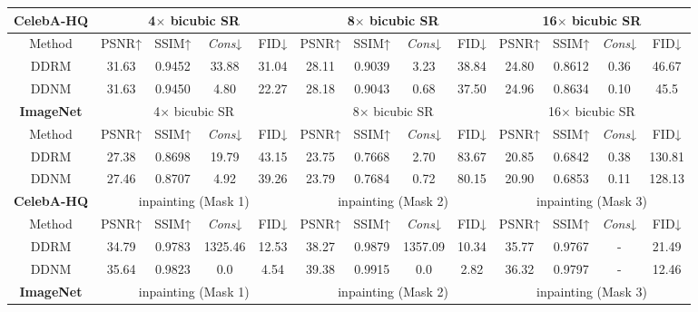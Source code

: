\documentclass{article} \usepackage{iclr2023_conference,times}
\begin{document}
\begin{table*}[h]
\scriptsize
    \begin{tabular}{c | cccc | cccc| cccc}
        \hline
           \multicolumn{1}{c}{\rule{0pt}{10pt}\tiny\textbf{CelebA-HQ}}&\multicolumn{4}{c}{4$\times$ bicubic SR} &\multicolumn{4}{c}{8$\times$ bicubic SR}&\multicolumn{4}{c}{16$\times$ bicubic SR}\\
        \hline
           \rule{0pt}{10pt}Method& PSNR↑&SSIM↑& \textit{Cons}↓&FID↓ &  PSNR↑&SSIM↑&  \textit{Cons}↓ &FID↓ &  PSNR↑&SSIM↑& \textit{Cons}↓&FID↓ \\
        \hline
            \rule{0pt}{10pt}{DDRM} &31.63&0.9452&33.88&31.04 & 28.11&0.9039&3.23&38.84 & 24.80&0.8612&0.36&46.67\\
            \rule{0pt}{10pt}{DDNM} &31.63&0.9450&4.80&22.27 & 28.18&0.9043&0.68&37.50 & 24.96&0.8634&0.10&45.5\\
        \hline
        \hline
           \multicolumn{1}{c}{\rule{0pt}{10pt}\tiny\textbf{ImageNet}}&\multicolumn{4}{c}{4$\times$ bicubic SR} &\multicolumn{4}{c}{8$\times$ bicubic SR}&\multicolumn{4}{c}{16$\times$ bicubic SR}\\
        \hline
           \rule{0pt}{10pt}Method& PSNR↑&SSIM↑& \textit{Cons}↓&FID↓ &  PSNR↑&SSIM↑&  \textit{Cons}↓ &FID↓ &  PSNR↑&SSIM↑& \textit{Cons}↓&FID↓ \\
        \hline
             \rule{0pt}{10pt}{DDRM} &27.38&0.8698&19.79&43.15&23.75&0.7668&2.70&83.67&20.85&0.6842&0.38&130.81\\
            \rule{0pt}{10pt}{DDNM}& 27.46&0.8707&4.92&39.26 & 23.79&0.7684&0.72&80.15 & 20.90&0.6853&0.11&128.13\\
        \hline
        \hline
            \multicolumn{1}{c}{\rule{0pt}{10pt}\tiny\textbf{CelebA-HQ}}&\multicolumn{4}{c}{inpainting (Mask 1)} &\multicolumn{4}{c}{inpainting (Mask 2)}&\multicolumn{4}{c}{inpainting (Mask 3)}\\
        \hline
           \rule{0pt}{10pt}Method& PSNR↑&SSIM↑& \textit{Cons}↓&FID↓ &  PSNR↑&SSIM↑&  \textit{Cons}↓ &FID↓ &  PSNR↑&SSIM↑& \textit{Cons}↓&FID↓ \\
        \hline
\rule{0pt}{10pt}{DDRM} &34.79&0.9783&1325.46&12.53 & 38.27&0.9879&1357.09&10.34 & 35.77&0.9767&-&21.49\\
            \rule{0pt}{10pt}{DDNM} &35.64&0.9823&0.0&4.54 & 39.38&0.9915&0.0&2.82 & 36.32&0.9797&-&12.46\\
        \hline
        \hline
           \multicolumn{1}{c}{\rule{0pt}{10pt}\tiny\textbf{ImageNet}}&\multicolumn{4}{c}{inpainting (Mask 1)} &\multicolumn{4}{c}{inpainting (Mask 2)}&\multicolumn{4}{c}{inpainting (Mask 3)}\\

\end{tabular}
\end{table*}
\end{document}
